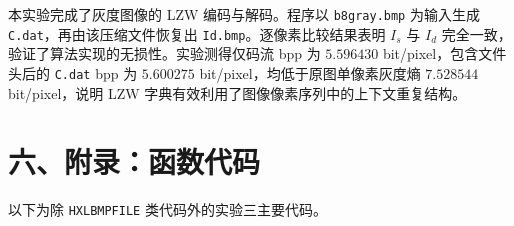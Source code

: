\documentclass[a4paper,zihao=5]{ctexart}
\begin{document}
本实验完成了灰度图像的 LZW 编码与解码。程序以 \texttt{b8gray.bmp} 为输入生成 \texttt{C.dat}，再由该压缩文件恢复出 \texttt{Id.bmp}。逐像素比较结果表明 $I_s$ 与 $I_d$ 完全一致，验证了算法实现的无损性。实验测得仅码流 bpp 为 $5.596430$ bit/pixel，包含文件头后的 \texttt{C.dat} bpp 为 $5.600275$ bit/pixel，均低于原图单像素灰度熵 $7.528544$ bit/pixel，说明 LZW 字典有效利用了图像像素序列中的上下文重复结构。

\section*{六、附录：函数代码}

以下为除 \texttt{HXLBMPFILE} 类代码外的实验三主要代码。


\end{document}
